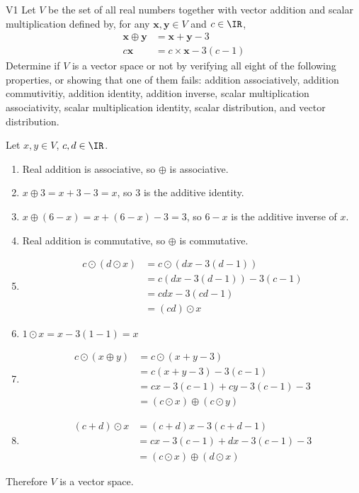 \begin{problem}{V1}
Let $V$ be the  set of all real numbers together with vector addition
and scalar multiplication defined by, for any $\mathbf{x},\mathbf{y} \in V$ and $c \in \IR$,
\begin{align*}
\mathbf{x}\oplus \mathbf{y}  &= \mathbf{x}+\mathbf{y}-3 \\
c \mathbf{x} &= c\times\mathbf{x}-3(c-1)
\end{align*}
Determine if $V$ is a vector space or not by verifying all eight of the
following properties, or showing that one of them fails: addition associatively,
addition commutivitiy, addition identity, addition inverse,
scalar multiplication associativity, scalar multiplication identity,
scalar distribution, and vector distribution.
\end{problem}

\begin{solution}
Let $x,y \in V$, $c,d \in \IR$.
\begin{enumerate}[1)]
\item Real addition is associative, so $\oplus$ is associative.
\item $x\oplus 3 = x+3-3=x$, so $3$ is the additive identity.
\item $x \oplus (6-x) = x+(6-x)-3=3$, so $6-x$ is the additive inverse of $x$.
\item Real addition is commutative, so $\oplus$ is commutative.
\item \begin{align*}
c\odot \left( d \odot x\right) &= c\odot \left( dx-3(d-1) \right) \\
&= c\left(dx-3(d-1)\right)-3(c-1) \\
&= cdx-3(cd-1) \\
&= (cd) \odot x
\end{align*}
\item $1 \odot x = x-3(1-1)=x$
\item \begin{align*} c \odot (x \oplus y) &=
c \odot (x+y-3) \\
&= c(x+y-3)-3(c-1) \\
&= cx-3(c-1) + cy-3(c-1) -3 \\
&= (c\odot x ) \oplus (c\odot y)
\end{align*}
\item \begin{align*} (c+d) \odot x &= (c+d)x-3(c+d-1) \\
&= cx-3(c-1)+dx-3(c-1)-3 \\
&= (c\odot x ) \oplus (d \odot x)
\end{align*}
\end{enumerate}

Therefore $V$ is a vector space.
\end{solution}

